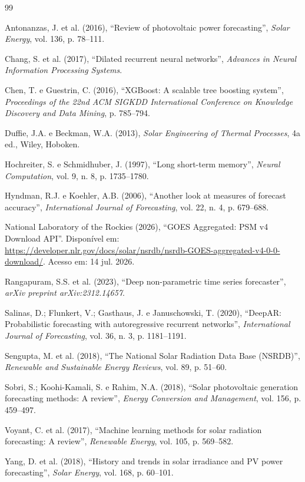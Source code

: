 \documentclass[12pt,a4paper]{article}
\begin{document}
\begin{thebibliography}{99}

Antonanzas, J. et al. (2016), ``Review of photovoltaic power forecasting'', \textit{Solar Energy}, vol. 136, p. 78--111.

Chang, S. et al. (2017), ``Dilated recurrent neural networks'', \textit{Advances in Neural Information Processing Systems}.

Chen, T. e Guestrin, C. (2016), ``XGBoost: A scalable tree boosting system'', \textit{Proceedings of the 22nd ACM SIGKDD International Conference on Knowledge Discovery and Data Mining}, p. 785--794.

Duffie, J.A. e Beckman, W.A. (2013), \textit{Solar Engineering of Thermal Processes}, 4a ed., Wiley, Hoboken.

Hochreiter, S. e Schmidhuber, J. (1997), ``Long short-term memory'', \textit{Neural Computation}, vol. 9, n. 8, p. 1735--1780.

Hyndman, R.J. e Koehler, A.B. (2006), ``Another look at measures of forecast accuracy'', \textit{International Journal of Forecasting}, vol. 22, n. 4, p. 679--688.

National Laboratory of the Rockies (2026), ``GOES Aggregated: PSM v4 Download API''. Disponível em: \url{https://developer.nlr.gov/docs/solar/nsrdb/nsrdb-GOES-aggregated-v4-0-0-download/}. Acesso em: 14 jul. 2026.

Rangapuram, S.S. et al. (2023), ``Deep non-parametric time series forecaster'', \textit{arXiv preprint arXiv:2312.14657}.

Salinas, D.; Flunkert, V.; Gasthaus, J. e Januschowski, T. (2020), ``DeepAR: Probabilistic forecasting with autoregressive recurrent networks'', \textit{International Journal of Forecasting}, vol. 36, n. 3, p. 1181--1191.

Sengupta, M. et al. (2018), ``The National Solar Radiation Data Base (NSRDB)'', \textit{Renewable and Sustainable Energy Reviews}, vol. 89, p. 51--60.

Sobri, S.; Koohi-Kamali, S. e Rahim, N.A. (2018), ``Solar photovoltaic generation forecasting methods: A review'', \textit{Energy Conversion and Management}, vol. 156, p. 459--497.

Voyant, C. et al. (2017), ``Machine learning methods for solar radiation forecasting: A review'', \textit{Renewable Energy}, vol. 105, p. 569--582.

Yang, D. et al. (2018), ``History and trends in solar irradiance and PV power forecasting'', \textit{Solar Energy}, vol. 168, p. 60--101.

\end{thebibliography}
\end{document}
